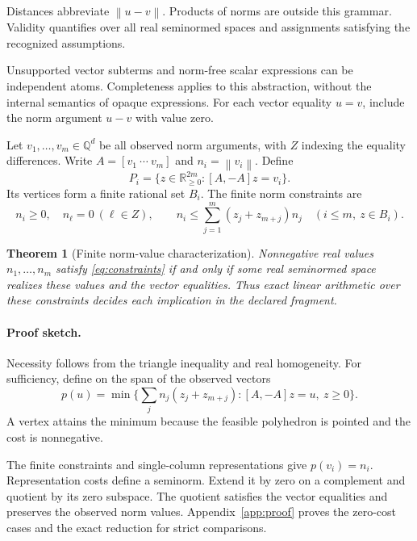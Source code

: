\documentclass{article}
\newtheorem{theorem}{Theorem}
\newcommand{\R}{\mathbb{R}}
\newcommand{\Q}{\mathbb{Q}}
\newcommand{\norm}[1]{\left\lVert#1\right\rVert}
\begin{document}
Distances abbreviate $\norm{u-v}$.
Products of norms are outside this grammar.
Validity quantifies over all real seminormed spaces and assignments satisfying the recognized assumptions.

Unsupported vector subterms and norm-free scalar expressions can be independent atoms.
Completeness applies to this abstraction, without the internal semantics of opaque expressions.
For each vector equality $u=v$, include the norm argument $u-v$ with value zero.

Let $v_1,\ldots,v_m\in\Q^d$ be all observed norm arguments, with $Z$ indexing the equality differences.
Write $A=[v_1\ \cdots\ v_m]$ and $n_i=\norm{v_i}$.
Define
\begin{equation}\label{eq:polyhedron}
 P_i=\{z\in\R_{\ge0}^{2m}:[A,-A]z=v_i\}.
\end{equation}
Its vertices form a finite rational set $B_i$.
The finite norm constraints are
\begin{equation}\label{eq:constraints}
 n_i\ge0,\quad n_\ell=0\ (\ell\in Z),\qquad
 n_i\le\sum_{j=1}^m(z_j+z_{m+j})n_j
 \quad(i\le m,\ z\in B_i).
\end{equation}

\begin{theorem}[Finite norm-value characterization]\label{thm:complete}
Nonnegative real values $n_1,\ldots,n_m$ satisfy \eqref{eq:constraints} if and only if some real seminormed space realizes these values and the vector equalities.
Thus exact linear arithmetic over these constraints decides each implication in the declared fragment.
\end{theorem}

\paragraph{Proof sketch.}
Necessity follows from the triangle inequality and real homogeneity.
For sufficiency, define on the span of the observed vectors
\begin{equation}\label{eq:gauge}
 p(u)=\min\{\textstyle\sum_j n_j(z_j+z_{m+j}):[A,-A]z=u,\ z\ge0\}.
\end{equation}
A vertex attains the minimum because the feasible polyhedron is pointed and the cost is nonnegative.

The finite constraints and single-column representations give $p(v_i)=n_i$.
Representation costs define a seminorm.
Extend it by zero on a complement and quotient by its zero subspace.
The quotient satisfies the vector equalities and preserves the observed norm values.
Appendix~\ref{app:proof} proves the zero-cost cases and the exact reduction for strict comparisons.
\end{document}
